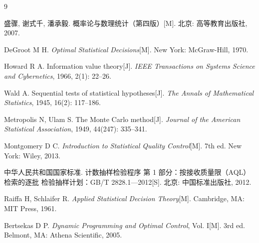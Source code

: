 \documentclass[withoutpreface,bwprint]{cumcmthesis}
\begin{document}
\newpage

\begin{thebibliography}{9}

盛骤, 谢式千, 潘承毅.
概率论与数理统计（第四版）[M].
北京: 高等教育出版社, 2007.

DeGroot M H.
\emph{Optimal Statistical Decisions}[M].
New York: McGraw-Hill, 1970.

Howard R A.
Information value theory[J].
\emph{IEEE Transactions on Systems Science and Cybernetics},
1966, 2(1): 22--26.

Wald A.
Sequential tests of statistical hypotheses[J].
\emph{The Annals of Mathematical Statistics},
1945, 16(2): 117--186.

Metropolis N, Ulam S.
The Monte Carlo method[J].
\emph{Journal of the American Statistical Association},
1949, 44(247): 335--341.

Montgomery D C.
\emph{Introduction to Statistical Quality Control}[M].
7th ed. New York: Wiley, 2013.

中华人民共和国国家标准.
计数抽样检验程序 第 1 部分：按接收质量限（AQL）检索的逐批
检验抽样计划：GB/T 2828.1—2012[S].
北京: 中国标准出版社, 2012.

Raiffa H, Schlaifer R.
\emph{Applied Statistical Decision Theory}[M].
Cambridge, MA: MIT Press, 1961.

Bertsekas D P.
\emph{Dynamic Programming and Optimal Control}, Vol. I[M].
3rd ed. Belmont, MA: Athena Scientific, 2005.

\end{thebibliography}

\newpage
\end{document}
